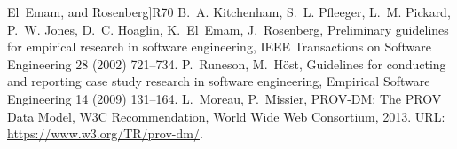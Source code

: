 \documentclass[10pt,a4paper]{article}
\providecommand{\bibinfo}[2]{#2}
\providecommand{\URLprefix}{URL: }
\begin{document}
\begin{thebibliography}{24}
{  El~Emam, and Rosenberg}]{R70}
\bibinfo{author}{B.~A. Kitchenham}, \bibinfo{author}{S.~L. Pfleeger},
  \bibinfo{author}{L.~M. Pickard}, \bibinfo{author}{P.~W. Jones},
  \bibinfo{author}{D.~C. Hoaglin}, \bibinfo{author}{K.~El~Emam},
  \bibinfo{author}{J.~Rosenberg},
\newblock \bibinfo{title}{Preliminary guidelines for empirical research in
  software engineering},
\newblock \bibinfo{journal}{IEEE Transactions on Software Engineering}
  \bibinfo{volume}{28} (\bibinfo{year}{2002}) \bibinfo{pages}{721--734}.
\bibinfo{author}{P.~Runeson}, \bibinfo{author}{M.~H{\"o}st},
\newblock \bibinfo{title}{Guidelines for conducting and reporting case study
  research in software engineering},
\newblock \bibinfo{journal}{Empirical Software Engineering}
  \bibinfo{volume}{14} (\bibinfo{year}{2009}) \bibinfo{pages}{131--164}.
\bibinfo{author}{L.~Moreau}, \bibinfo{author}{P.~Missier},
  \bibinfo{title}{PROV-DM: The PROV Data Model}, \bibinfo{type}{W3C
  Recommendation}, World Wide Web Consortium, \bibinfo{year}{2013}. \URLprefix
  \url{https://www.w3.org/TR/prov-dm/}.
\end{thebibliography}
\end{document}
